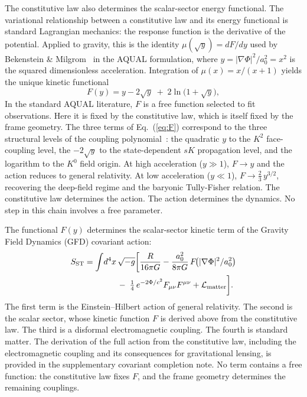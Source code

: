 \documentclass[twocolumn]{iopjournal}
\begin{document}
The constitutive law also determines the scalar-sector
energy functional.  The variational relationship between a
constitutive law and its energy functional is standard
Lagrangian mechanics: the response function is the derivative
of the potential.  Applied to gravity, this is the identity
$\mu(\sqrt{y}) = dF/dy$ used by Bekenstein \&
Milgrom~\cite{BekensteinMilgrom1984} in the AQUAL
formulation, where
$y = |\nabla\Phi|^2/a_0^2 = x^2$ is the squared
dimensionless acceleration.  Integration of
$\mu(x) = x/(x{+}1)$ yields the unique kinetic functional
\begin{equation}
  F(y) = y - 2\sqrt{y} \;+\; 2\ln\!\bigl(1 + \sqrt{y}\bigr),
  \label{eq:F}
\end{equation}
In the standard AQUAL literature, $F$ is a free function
selected to fit observations.  Here it is fixed by the
constitutive law, which is itself fixed by the frame geometry.
The three terms of Eq.~(\ref{eq:F}) correspond to the three
structural levels of
the coupling polynomial~\cite{Nelson2026b}: the quadratic $y$
to the $K^2$ face-coupling level, the $-2\sqrt{y}$ to the
state-dependent $sK$ propagation level, and the logarithm to
the $K^0$ field origin.  At high acceleration ($y \gg 1$),
$F \to y$ and the action reduces to general relativity.  At
low acceleration ($y \ll 1$), $F \to \tfrac{2}{3}\,y^{3/2}$,
recovering the deep-field regime and the baryonic Tully-Fisher
relation.  The constitutive law determines the action.  The
action determines the dynamics.  No step in this chain
involves a free parameter.

The functional $F(y)$ determines the scalar-sector kinetic
term of the Gravity Field Dynamics (GFD) covariant action:
\begin{align}
  S_{\text{ST}} &= \int\!d^4x\,\sqrt{-g}\biggl[
    \frac{R}{16\pi G}
    - \frac{a_0^2}{8\pi G}\,F\!\bigl(|\nabla\Phi|^2/a_0^2\bigr)
    \notag\\
    &\qquad\qquad
    -\; \tfrac{1}{4}\,e^{-2\Phi/c^2}
    F_{\mu\nu}F^{\mu\nu}
    + \mathcal{L}_{\text{matter}}
  \biggr].
  \label{eq:sst}
\end{align}
The first term is the Einstein--Hilbert action of general
relativity.  The second is the scalar sector, whose kinetic
function $F$ is derived above from the constitutive law.  The
third is a disformal electromagnetic coupling.  The fourth is
standard matter.  The derivation of the full action from the
constitutive law, including the electromagnetic coupling and
its consequences for gravitational lensing, is provided in
the supplementary covariant completion note.  No term
contains a free function: the constitutive law fixes $F$, and
the frame geometry determines the remaining couplings.
\end{document}
